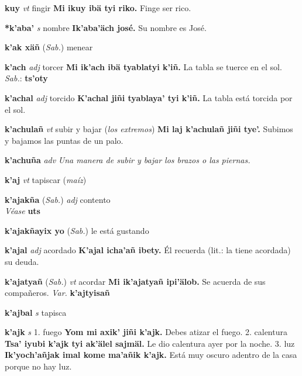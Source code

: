 \documentclass[10pt]{scrbook}
\newcommand{\entry}[1]{\textbf{#1}}
\newcommand{\alphaletter}[1]{\end{multicols}\addsec{#1}\begin{multicols}{2}}
\newcommand{\onedefinition}[1]{#1.}
\newcommand{\nontranslationdef}[1]{\textit{#1}}
\newcommand{\partofspeech}[1]{\textit{#1}}
\newcommand{\spanishtranslation}[1]{#1}
\newcommand{\clarification}[1]{(\textit{#1})}
\newcommand{\cholexample}[1]{\textbf{#1}}
\newcommand{\exampletranslation}[1]{#1}
\newcommand{\dialectvariant}[1]{\\\textit{#1}:}
\newcommand{\dialectword}[1]{\textbf{#1}}
\newcommand{\alsosee}[1]{\\\textit{Véase} \textbf{#1}}
\newcommand{\relevantdialect}[1]{(\textit{#1})}
\newcommand{\variation}[1]{\textit{Var.} \textbf{#1}}
\begin{document}
\begin{multicols}{2}
\entry{kuy}
\partofspeech{vt}
\spanishtranslation{fingir}
\cholexample{Mi ikuy ibä tyi riko.}
\exampletranslation{Finge ser rico.}

\alphaletter{K'}

\entry{*k'aba'}
\partofspeech{s}
\spanishtranslation{nombre}
\cholexample{Ik'aba'äch josé.}
\exampletranslation{Su nombre es José.}

\entry{k'ak xäñ}
\relevantdialect{Sab.}
\spanishtranslation{menear}

\entry{k'ach}
\partofspeech{adj}
\spanishtranslation{torcer}
\cholexample{Mi ik'ach ibä tyablatyi k'iñ.}
\exampletranslation{La tabla se tuerce en el sol.}
\dialectvariant{Sab.}
\dialectword{ts'oty}

\entry{k'achal}
\partofspeech{adj}
\spanishtranslation{torcido}
\cholexample{K'achal jiñi tyablaya' tyi k'iñ.}
\exampletranslation{La tabla está torcida por el sol.}

\entry{k'achulañ}
\partofspeech{vt}
\spanishtranslation{subir y bajar}
\clarification{los extremos}
\cholexample{Mi laj k'achulañ jiñi tye'.}
\exampletranslation{Subimos y bajamos las puntas de un palo.}

\entry{k'achuña}
\partofspeech{adv}
\nontranslationdef{Una manera de subir y bajar los brazos o las piernas.}

\entry{k'aj}
\partofspeech{vt}
\spanishtranslation{tapiscar}
\clarification{maíz}

\entry{k'ajakña}
\relevantdialect{Sab.}
\partofspeech{adj}
\spanishtranslation{contento}
\alsosee{uts}

\entry{k'ajakñayix yo}
\relevantdialect{Sab.}
\spanishtranslation{le está gustando}

\entry{k'ajal}
\partofspeech{adj}
\spanishtranslation{acordado}
\cholexample{K'ajal icha'añ ibety.}
\exampletranslation{Él recuerda (lit.: la tiene acordada) su deuda.}

\entry{k'ajatyañ}
\relevantdialect{Sab.}
\partofspeech{vt}
\spanishtranslation{acordar}
\cholexample{Mi ik'ajatyañ ipi'älob.}
\exampletranslation{Se acuerda de sus compañeros.}
\variation{k'ajtyisañ}

\entry{k'ajbal}
\partofspeech{s}
\spanishtranslation{tapisca}

\entry{k'ajk}
\partofspeech{s}
\onedefinition{1}
\spanishtranslation{fuego}
\cholexample{Yom mi axik' jiñi k'ajk.}
\exampletranslation{Debes atizar el fuego.}
\onedefinition{2}
\spanishtranslation{calentura}
\cholexample{Tsa' iyubi k'ajk tyi ak'älel sajmäl.}
\exampletranslation{Le dio calentura ayer por la noche.}
\onedefinition{3}
\spanishtranslation{luz}
\cholexample{Ik'yoch'añjak imal kome ma'añik k'ajk.}
\exampletranslation{Está muy oscuro adentro de la casa porque no hay luz.}


\end{multicols}
\end{document}
